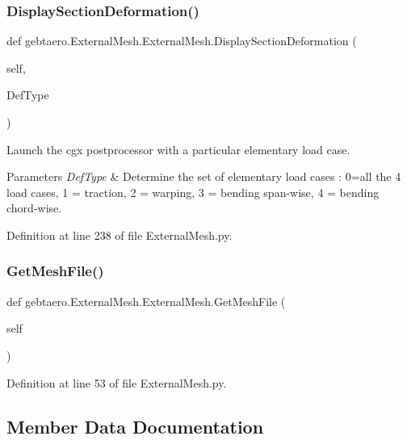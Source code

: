 \subsubsection{\texorpdfstring{Display\+Section\+Deformation()}{DisplaySectionDeformation()}}
{\footnotesize\ttfamily def gebtaero.\+External\+Mesh.\+External\+Mesh.\+Display\+Section\+Deformation (\begin{DoxyParamCaption}\item[{}]{self,  }\item[{}]{Def\+Type }\end{DoxyParamCaption})}



Launch the cgx postprocessor with a particular elementary load case. 


\begin{DoxyParams}{Parameters}
{\em Def\+Type} & Determine the set of elementary load cases \+: 0=all the 4 load cases, 1 = traction, 2 = warping, 3 = bending span-\/wise, 4 = bending chord-\/wise. \\
\hline
\end{DoxyParams}


Definition at line 238 of file External\+Mesh.\+py.

\mbox{\label{classgebtaero_1_1_external_mesh_1_1_external_mesh_a9ac15ea158d9eeccf982355c551ae334}} 
\subsubsection{\texorpdfstring{Get\+Mesh\+File()}{GetMeshFile()}}
{\footnotesize\ttfamily def gebtaero.\+External\+Mesh.\+External\+Mesh.\+Get\+Mesh\+File (\begin{DoxyParamCaption}\item[{}]{self }\end{DoxyParamCaption})}



Definition at line 53 of file External\+Mesh.\+py.



\subsection{Member Data Documentation}
\mbox{\label{classgebtaero_1_1_external_mesh_1_1_external_mesh_ac9f8fc4f8dd8e81757bc8a5b2b5323d4}} 
